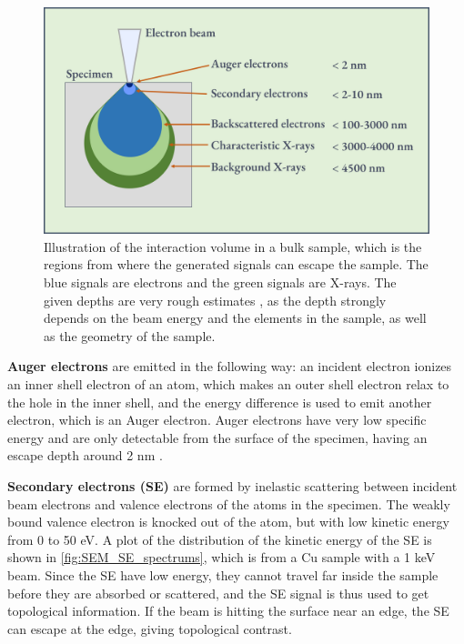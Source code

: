 \begin{figure}[ht]
    \centering
    \includegraphics[width=0.9\linewidth]{figures/interaction_volume.png}
    \caption{
        Illustration of the interaction volume in a bulk sample, which is the regions from where the generated signals can escape the sample.
        The blue signals are electrons and the green signals are X-rays.
        The given depths are very rough estimates \cite{goldstein_scanning_2018,hollas_modern_2004}, as the depth strongly depends on the beam energy and the elements in the sample, as well as the geometry of the sample.
    }
    \label{fig:interaction_volume}
\end{figure}



\textbf{Auger electrons} are emitted in the following way: an incident electron ionizes an inner shell electron of an atom, which makes an outer shell electron relax to the hole in the inner shell, and the energy difference is used to emit another electron, which is an Auger electron.
Auger electrons have very low specific energy and are only detectable from the surface of the specimen, having an escape depth around 2 nm \cite{hollas_modern_2004}.


\textbf{Secondary electrons (SE)} are formed by inelastic scattering between incident beam electrons and valence electrons of the atoms in the specimen.
The weakly bound valence electron is knocked out of the atom, but with low kinetic energy from 0 to 50 eV.
A plot of the distribution of the kinetic energy of the SE is shown in \cref{fig:SEM_SE_spectrums}, which is from a Cu sample with a 1 keV beam.
Since the SE have low energy, they cannot travel far inside the sample before they are absorbed or scattered, and the SE signal is thus used to get topological information.
If the beam is hitting the surface near an edge, the SE can escape at the edge, giving topological contrast.


